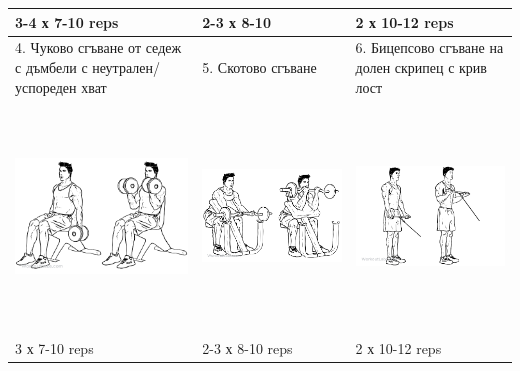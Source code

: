 \documentclass{article}
\begin{document}
\begin{tabular}{ | m{5cm} | m{5cm} | m{5cm} | }
3-4 х 7-10 reps & 2-3 х 8-10 & 2 х 10-12 reps \\
\hline
4. Чуково сгъване от седеж с дъмбели с неутрален/успореден хват  & 
5. Скотово сгъване  & 
6. Бицепсово сгъване на долен скрипец с крив лост \\ 
\begin{minipage}{5cm} \includegraphics[width=\linewidth, height=60mm]{Seated_Dumbbell_Curl.png} \end{minipage} &
\begin{minipage}{5cm} \includegraphics[width=\linewidth, height=60mm]{Ez-bar_Precher_Curl.png} \end{minipage} & 
\begin{minipage}{5cm} \includegraphics[width=\linewidth, height=60mm]{Cable_Curl.png} \end{minipage} \\ 
3 х 7-10 reps &  2-3 х 8-10 reps&  2 х 10-12 reps\\ 
\hline
\end{tabular}
\end{document}
